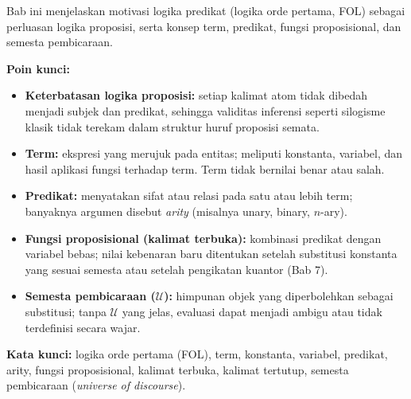 \documentclass[../main]{subfiles}
\begin{document}

\begin{rangkuman}
Bab ini menjelaskan motivasi logika predikat (logika orde pertama, FOL) sebagai perluasan logika proposisi, serta konsep term, predikat, fungsi proposisional, dan semesta pembicaraan.

\textbf{Poin kunci:}
\begin{itemize}
  \item \textbf{Keterbatasan logika proposisi:} setiap kalimat atom tidak dibedah menjadi subjek dan predikat, sehingga validitas inferensi seperti silogisme klasik tidak terekam dalam struktur huruf proposisi semata.
  \item \textbf{Term:} ekspresi yang merujuk pada entitas; meliputi konstanta, variabel, dan hasil aplikasi fungsi terhadap term. Term tidak bernilai benar atau salah.
  \item \textbf{Predikat:} menyatakan sifat atau relasi pada satu atau lebih term; banyaknya argumen disebut \textit{arity} (misalnya unary, binary, $n$-ary).
  \item \textbf{Fungsi proposisional (kalimat terbuka):} kombinasi predikat dengan variabel bebas; nilai kebenaran baru ditentukan setelah substitusi konstanta yang sesuai semesta atau setelah pengikatan kuantor (Bab 7).
  \item \textbf{Semesta pembicaraan ($\mathcal{U}$):} himpunan objek yang diperbolehkan sebagai substitusi; tanpa $\mathcal{U}$ yang jelas, evaluasi dapat menjadi ambigu atau tidak terdefinisi secara wajar.
\end{itemize}

\textbf{Kata kunci:} logika orde pertama (FOL), term, konstanta, variabel, predikat, arity, fungsi proposisional, kalimat terbuka, kalimat tertutup, semesta pembicaraan (\textit{universe of discourse}).
\end{rangkuman}

\ifSubfilesClassLoaded{
  \renewcommand{\bibname}{Daftar Pustaka}
  
  
}{}
\end{document}
